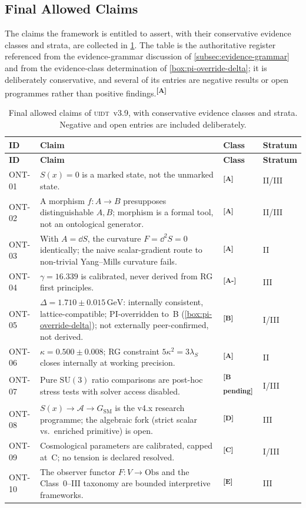 \documentclass[12pt,a4paper,twoside]{article}
\theoremstyle{plain}
\theoremstyle{definition}
\theoremstyle{remark}
\newcommand{\UIDT}{\textsc{uidt}}
\newcommand{\GeV}{\,\mathrm{GeV}}
\newcommand{\catmark}[1]{\textsuperscript{\textsf{\textbf{[#1]}}}}
\newcommand{\DeltaGap}{1.710 \pm 0.015\GeV} %
\newcommand{\GammaGeom}{16.339} %
\newcommand{\KappaRG}{0.500 \pm 0.008} %
\begin{document}
\subsection{Final Allowed Claims}
\label{sec:final-claims}

The claims the framework is entitled to assert, with their conservative evidence classes and strata, are collected in \cref{tab:claims}. The table is the authoritative register referenced from the evidence-grammar discussion of \cref{subsec:evidence-grammar} and from the evidence-class determination of \cref{box:pi-override-delta}; it is deliberately conservative, and several of its entries are negative results or open programmes rather than positive findings.\catmark{A}

{\small
\renewcommand{\arraystretch}{1.3}
\begin{longtable}{p{} p{} p{} p{}}
\caption{Final allowed claims of \UIDT\ v3.9, with conservative evidence classes
and strata. Negative and open entries are included deliberately.}
\label{tab:claims}\\
\toprule
\textbf{ID} & \textbf{Claim} & \textbf{Class} & \textbf{Stratum} \\
\midrule
\endfirsthead
\toprule
\textbf{ID} & \textbf{Claim} & \textbf{Class} & \textbf{Stratum} \\
\midrule
\endhead
\bottomrule
\endfoot
ONT-01 & $S(x)=0$ is a marked state, not the unmarked state. & \catmark{A} & II/III \\
ONT-02 & A morphism $f\colon A\to B$ presupposes distinguishable $A,B$; morphism is a formal tool, not an ontological generator. & \catmark{A} & II/III \\
ONT-03 & With $A=\dd S$, the curvature $F=\dd^2 S=0$ identically; the naive scalar-gradient route to non-trivial Yang--Mills curvature fails. & \catmark{A} & II \\
ONT-04 & $\gamma = \GammaGeom$ is calibrated, never derived from RG first principles. & \catmark{A-} & III \\
ONT-05 & $\Delta = \DeltaGap$: internally consistent, lattice-compatible; PI-overridden to~B (\cref{box:pi-override-delta}); not externally peer-confirmed, not derived. & \catmark{B} & I/III \\
ONT-06 & $\kappa = \KappaRG$; RG constraint $5\kappa^2 = 3\lambda_S$ closes internally at working precision. & \catmark{A} & II \\
ONT-07 & Pure $\mathrm{SU}(3)$ ratio comparisons are post-hoc stress tests with solver access disabled. & \catmark{B\,pending} & I/III \\
ONT-08 & $S(x)\to\mathcal{A}\to G_{\mathrm{SM}}$ is the v4.x research programme; the algebraic fork (strict scalar vs.\ enriched primitive) is open. & \catmark{D} & III \\
ONT-09 & Cosmological parameters are calibrated, capped at~C; no tension is declared resolved. & \catmark{C} & I/III \\
ONT-10 & The observer functor $F\colon V\to\mathrm{Obs}$ and the Class~0--III taxonomy are bounded interpretive frameworks. & \catmark{E} & III \\
\bottomrule
\end{longtable}
}
\end{document}
